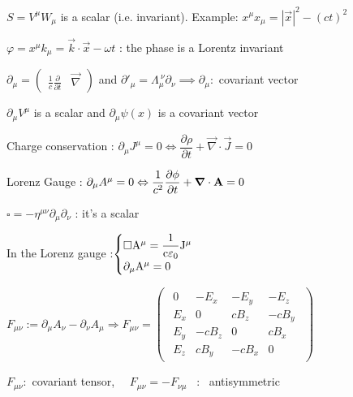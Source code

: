 \item $S = V^{\mu}W_{\mu}$ is a scalar (i.e. invariant). Example: $x^{\mu}x_{\mu} =  |\vec{x}|^2 -(ct)^2$

\item $\varphi = x^\mu k_\mu =  \vec{k}\cdot\vec{x}-\omega t $ : the phase is a Lorentz invariant 


\item $\partial_{\mu} = 
\begin{pmatrix}
\frac{1}{c} \frac{\partial}{\partial t} &
\vec{\nabla}
\end{pmatrix}$ and $\partial'_{\mu} = \Lambda^{\ \nu}_{\mu} \partial_{\nu} \implies \partial_{\mu} :$ covariant vector

\item $\partial_{\mu} V^{\mu}$ is a scalar and $\partial_{\mu} \psi(x) $ is a covariant vector
\squishend
{}
\squishlist
\item Charge conservation : $\partial_{\mu}J^{\mu} = 0 \Leftrightarrow \dfrac{\partial \rho}{\partial t} + \vec{\nabla} \cdot \vec{J} = 0 $

\item Lorenz Gauge : $\partial_{\mu} A^{\mu} = 0 \Leftrightarrow \dfrac{1}{c^2} \dfrac{\partial \phi}{\partial t} + \vec{\nabla} \cdot \vec{\rm{A}} = 0$

\item $\square = -\eta^{\mu\nu} \partial_{\mu}\partial_{\nu}$ : it's a scalar 

\item In the Lorenz gauge :$\begin{cases}
\square \rm{A}^{\mu} = \dfrac{1}{c \varepsilon_0 }  J^{\mu}  \\
\partial_{\mu} \rm{A}^{\mu} = 0
\end{cases}$



\item $F_{\mu\nu}:=\partial_\mu A_\nu-\partial_\nu A_\mu \Rightarrow F_{\mu\nu}=\begin{pmatrix}
\begin{array}{cccc}
0 & -E_x & -E_y & -E_z \\ 
E_x & 0 & c B_z & -c B_y \\ 
E_y&-cB_z  & 0 & c B_x \\ 
E_z&  cB_y& -cB_x & 0
\end{array} 
\end{pmatrix}$

\item $F_{\mu\nu} : $ covariant tensor, $\quad F_{\mu\nu} = - F_{\nu\mu}$ \, : \, antisymmetric

